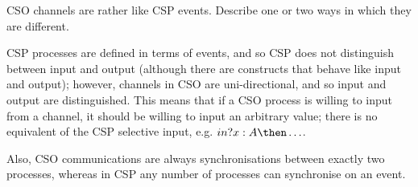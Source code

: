 \begin{question}
CSO channels are rather like CSP events.  Describe one or two ways in
which they are different.
\end{question}


\begin{answer}
CSP processes are defined in terms of events, and so CSP does not distinguish
between input and output (although there are constructs that behave like input
and output); however, channels in CSO are uni-directional, and so input and
output are distinguished.  This means that if a CSO process is willing to
input from a channel, it should be willing to input an arbitrary value; there
is no equivalent of the CSP selective input, e.g. $in?x:A \then \ldots$.

Also, CSO communications are always synchronisations between exactly two
processes, whereas in CSP any number of processes can synchronise on an
event. 
\end{answer}
